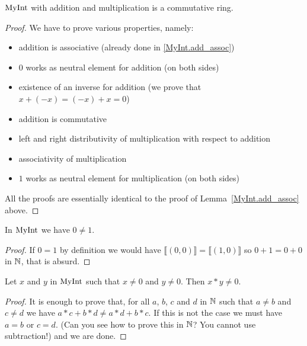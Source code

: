 \begin{proposition}
    \label{MyInt.commRing}
    \leanok
    $\mathrm{MyInt}$ with addition and multiplication is a commutative ring.
\end{proposition}
\begin{proof}
    \leanok
    We have to prove various properties, namely:
    \begin{itemize}
        \item addition is associative (already done in \ref{MyInt.add_assoc})
        \item $0$ works as neutral element for addition (on both sides)
        \item existence of an inverse for addition (we prove that $x + (-x) = (-x) + x = 0$)
        \item addition is commutative
        \item left and right distributivity of multiplication with respect to addition
        \item associativity of multiplication
        \item $1$ works as neutral element for multiplication (on both sides)
    \end{itemize}
    All the proofs are essentially identical to the proof of Lemma~\ref{MyInt.add_assoc} above.
\end{proof}

\begin{lemma}
    \label{MyInt.zero_ne_one}
    \leanok
In $\mathrm{MyInt}$ we have $0 \neq 1$.
\end{lemma}
\begin{proof}
    \leanok
    If $0 = 1$ by definition we would have $⟦ (0,0) ⟧ = ⟦ (1,0) ⟧$
    so $0+1=0+0$ in $\mathbb{N}$, that is absurd.
\end{proof}

\begin{lemma}
    \label{MyInt.mul_ne_zero}
    \leanok
Let $x$ and $y$ in $\mathrm{MyInt}$ such that $x \neq 0$ and $y \neq 0$. Then $x*y \neq 0$.
\end{lemma}
\begin{proof}
    \leanok
    It is enough to prove that, for all $a$, $b$, $c$ and $d$ in $\mathbb{N}$ such that $a \neq b$ and $c \neq d$ we have $a*c+b*d\neq a*d+b*c$. If this is not the case we must have $a = b$ or $c = d$. (Can you see how to prove this in $\mathbb{N}$? You cannot use subtraction!) and we are done.
\end{proof}

